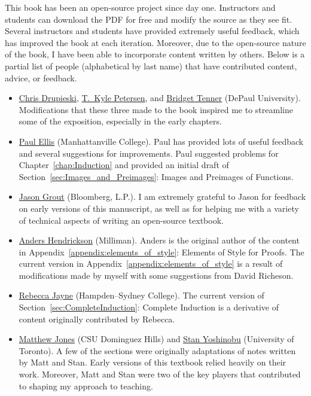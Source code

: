 \documentclass[11pt]{article}%
\newcommand{\blankline}{\pagebreak[2]\vspace{.5\baselineskip}}
\begin{document}
\blankline

This book has been an open-source project since day one. Instructors and students can download the PDF for free and modify the source as they see fit. Several instructors and students have provided extremely useful feedback, which has improved the book at each iteration. Moreover, due to the open-source nature of the book, I have been able to incorporate content written by others. Below is a partial list of people (alphabetical by last name) that have contributed content, advice, or feedback.

\begin{itemize}
\item \href{https://math.depaul.edu/cdrupies/}{Chris Drupieski}, \href{http://math.depaul.edu/tpeter21/}{T.~Kyle Petersen}, and \href{http://math.depaul.edu/bridget/}{Bridget Tenner} (DePaul University). Modifications that these three made to the book inspired me to streamline some of the exposition, especially in the early chapters.
\item \href{http://www.paulellis.org}{Paul Ellis} (Manhattanville College). Paul has provided lots of useful feedback and several suggestions for improvements. Paul suggested problems for Chapter~\ref{chap:Induction} and provided an initial draft of Section~\ref{sec:Images_and_Preimages}: Images and Preimages of Functions.
\item \href{http://jasongrout.org}{Jason Grout} (Bloomberg, L.P.).  I am extremely grateful to Jason for feedback on early versions of this manuscript, as well as for helping me with a variety of technical aspects of writing an open-source textbook.
\item \href{https://www.linkedin.com/in/andershendrickson/}{Anders Hendrickson} (Milliman). Anders is the original author of the content in Appendix~\ref{appendix:elements_of_style}: Elements of Style for Proofs. The current version in Appendix~\ref{appendix:elements_of_style} is a result of modifications made by myself with some suggestions from David Richeson.
\item \href{http://www.hsc.edu/rebecca-jayne}{Rebecca Jayne} (Hampden--Sydney College). The current version of Section~\ref{sec:CompleteInduction}: Complete Induction is a derivative of content originally contributed by Rebecca.
\item \href{https://www.linkedin.com/in/matt-jones-a704aab/}{Matthew Jones} (CSU Dominguez Hills) and \href{https://www.math.toronto.edu/cms/people/faculty/yoshinobu-stan/}{Stan Yoshinobu} (University of Toronto). A few of the sections were originally adaptations of notes written by Matt and Stan. Early versions of this textbook relied heavily on their work. Moreover, Matt and Stan were two of the key players that contributed to shaping my approach to teaching.

\end{itemize}
\end{document}
